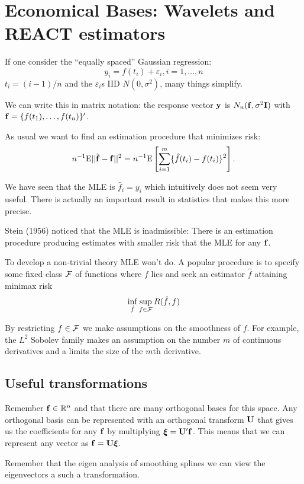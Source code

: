 \section{Economical Bases: Wavelets and REACT estimators }
If one consider the ``equally spaced'' Gaussian regression:
\begin{equation}
\label{lastmodel}
y_i = f(t_i) + \varepsilon_i, i=1,\dots,n
\end{equation}
$t_i = (i-1)/n$ and the $\varepsilon_i$s IID $N(0,\sigma^2)$, many things
simplify. 
 
We can write this in matrix notation: the response vector ${\mathbf y}$ is 
$N_n({\mathbf f},\sigma^2{\mathbf I})$ 
with ${\mathbf f}=\{f(t_1),\dots,f(t_n)\}'$. 

As usual we want to find an estimation  procedure that minimizes risk:
\[
n^{-1} \mbox{E} || \hat{{\mathbf f}} - {\mathbf f} ||^2 = n^{-1} \mbox{E} \left[ \sum_{i=1}^m \{
 \hat{f}(t_i) - f(t_i) \}^2\right].
\]

We have seen that the MLE is $\hat{f}_i = y_i$ which intuitively does
not seem very useful. There is actually an  
important result in statistics that makes this more precise. 

Stein (1956) noticed that the MLE is 
inadmissible: There is an estimation 
procedure producing estimates with smaller risk that the MLE for any 
${\mathbf f}$.

To develop a non-trivial theory MLE won't do. A popular procedure is
to specify
some fixed class $\cal F$ of functions where  $f$ lies and seek an
estimator $\hat{f}$ attaining minimax risk  
\[
\inf_{\hat{f}} \sup_{f \in {\cal F}} R(\hat{f},f)
\]

By restricting $f \in \cal F$ we make assumptions on the smoothness of
$f$. For example, the $L^2$ Sobolev family makes an assumption 
on the number $m$ of continuous derivatives and a limits the size of the
$m$th derivative.


\subsection{Useful transformations}
Remember  ${\mathbf f} \in {\mathbb R}^n$ and that there are many
orthogonal bases for this space. Any orthogonal basis can be
represented with an 
orthogonal transform ${\mathbf U}$ that gives us the coefficients for any ${\mathbf f}$
by multiplying $\mbox{\boldmath $\xi$\unboldmath} = {\mathbf U}' {\mathbf f}$. This means that we can represent any
vector as ${\mathbf f} = {\mathbf U} \mbox{\boldmath $\xi$\unboldmath}$. 

Remember that the eigen analysis of smoothing splines we can view the
eigenvectors a such a transformation.

